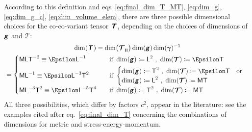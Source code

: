 \documentclass[\ifafour a4paper,12pt,\else a5paper,10pt,\fi%
onecolumn,oneside,article,%
british%
]{memoir}
\makeatletter
\theoremstyle{remark}
\theoremstyle{innote}
\newcommand*{\mathte}[1]{\textbf{\textit{\textsf{#1}}}}
\newcommand*{\defd}{\coloneqq}
\renewcommand*{\|}[1][]{\nonscript\,#1\vert\nonscript\;\mathopen{}}
\newcommand*{\sect}{\S}%
\newcommand*{\eqn}{eq.}%
\newcommand*{\eqns}{eqs}%
\newcommand*{\q}{}%
\DeclareRobustCommand*{\q}{%
  \mathord{\mathpalette\bigcdot@{}}%
}
\newcommand*{\bigcdot@scalefactor}{0.7}
\newcommand*{\bigcdot@widthfactor}{1.5}
\newcommand*{\bigcdot@}[2]{%
  \sbox0{$#1\vcenter{}$}%
  \sbox2{$#1\cdot\m@th$}%
  \hbox to \bigcdot@widthfactor\wd2{%
    \hfil
    \raise\ht0\hbox{%
      \scalebox{\bigcdot@scalefactor}{%
        \lower\ht0\hbox{$#1\bullet\m@th$}%
      }%
    }%
    \hfil
  }%
}
\newcommand*{\Le}{\textsf{L}}
\newcommand*{\Ti}{\textsf{T}}
\newcommand*{\Ma}{\textsf{M}}
\newcommand*{\En}{\Epsilon}%
\newcommand*{\yg}{\mathte{g}}
\newcommand*{\yT}{\bm{\mathcal{T}}}
\newcommand*{\yTe}{\mathte{T}}
\renewcommand*{\i}{\indices}
\newcommand*{\ygv}{\bm{\gamma}}
\newcommand*{\rul}{{\mkern2mu\rule[-0.1ex]{0.75pt}{1.1ex}\mkern2mu}}
\DeclarePairedDelimiter\mul{\rul}{\rul}%
\makeatother
\begin{document}
According to this definition and \eqns~\eqref{eq:final_dim_T_MT},
\eqref{eq:dim_g}, \eqref{eq:dim_g_c}, \eqref{eq:dim_volume_elem}, there are
three possible dimensional choices for the co-co-variant tensor $\yTe$,
depending on the choices of dimensions of $\yg$ and $\yT$:
\begin{multline}
\label{eq:dim_co_co_T}
\dim(\yTe\i{_{\q\q}}) =
\dim\bigl(\yT\i{_{\q \mul{\q\q\q}}}\bigr) \dim(\yg) \dim(\ygv)^{-1}
  \\{}=
  \begin{cases}
    \Ma\Le\Ti^{-2} \equiv \En\Le^{-1} & \quad\text{if}\ 
\dim(\yg)\defd \Le^2 \ ,\ \dim(\yT)\defd \En\Ti
    \\[\jot]
\Ma\Le^{-1} \equiv \En\Le^{-3}\Ti^{2} & \quad\text{if}\ 
 \begin{cases}
\dim(\yg)\defd \Ti^2 \ ,\ \dim(\yT)\defd \En\Ti 
    \quad\text{or}\\
\dim(\yg)\defd \Le^2 \ ,\ \dim(\yT)\defd \Ma\Ti 
 \end{cases}
   \\[2\jot]
    \Ma\Le^{-3}\Ti^{2} \equiv \En\Le^{-5}\Ti^{4} & \quad\text{if}\ 
\dim(\yg)\defd \Ti^2 \ ,\ \dim(\yT)\defd \Ma\Ti
  \end{cases}
\end{multline}
All three possibilities, which differ by factors $c^{2}$, appear in the
literature: see the examples cited after \eqn~\eqref{eq:final_dim_T}
concerning the combinations of dimensions for metric and
stress-energy-momentum.

 


\end{document}
